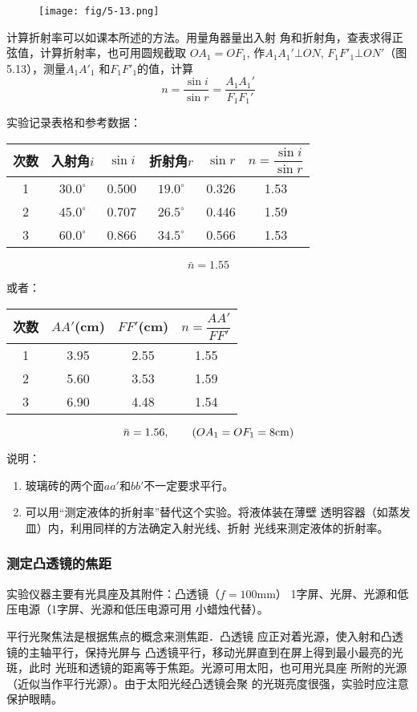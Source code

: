 \begin{figure}[htp]
    \centering
    \texttt{[image: fig/5-13.png]}
    \caption{}
\end{figure}

计算折射率可以如课本所述的方法。用量角器量出入射
角和折射角，查表求得正弦值，计算折射率，也可用圆规截取
$OA_1=OF_1$, 作$A_1A_1'\bot ON$, $F_1F'_1\bot ON'$（图5.13），测量$A_1A'_1$
和$F_1F'_1$的值，计算 
$$n=\frac{\sin i}{\sin r}=\frac{A_1A_1'}{F_1F_1'}$$

实验记录表格和参考数据：
\begin{center}
\begin{tabular}{c|ccccc}
\hline
次数&入射角$i$&$\sin i$&折射角$r$ &$\sin r$&$n=\dfrac{\sin i}{\sin r}$\\
\hline
1&$30.0^{\circ}$&0.500&$19.0^{\circ}$&0.326&1.53\\
2&$45.0^{\circ}$&0.707&$26.5^{\circ}$&0.446&1.59\\
3&$60.0^{\circ}$&0.866&$34.5^{\circ}$&0.566&1.53\\
\hline
\end{tabular}
\[\bar n=1.55\]
\end{center}
或者：
\begin{center}
\begin{tabular}{c|ccc}
\hline
次数&$AA'$(cm)&$FF'$(cm)&$n=\dfrac{AA'}{FF'}$\\
\hline
1&3.95&2.55&1.55\\
2&5.60&3.53&1.59\\
3&6.90&4.48&1.54\\
\hline
\end{tabular}
\[\bar n=1.56,\qquad (OA_1=OF_1=8{\rm cm})\]
\end{center}

说明：
\begin{enumerate}
\item 玻璃砖的两个面$aa'$和$bb'$不一定要求平行。
\item  可以用“测定液体的折射率”替代这个实验。将液体装在薄壁
透明容器（如蒸发皿）内，利用同样的方法确定入射光线、折射
光线来测定液体的折射率。
\end{enumerate}

\subsubsection{测定凸透镜的焦距}
实验仪器主要有光具座及其附件：凸透镜（$f=100$mm）
1字屏、光屏、光源和低压电源（1字屏、光源和低压电源可用
小蜡烛代替）。

平行光聚焦法是根据焦点的概念来测焦距．凸透镜
应正对着光源，使入射和凸透镜的主轴平行，保持光屏与
凸透镜平行，移动光屏直到在屏上得到最小最亮的光斑，此时
光班和透镜的距离等于焦距。光源可用太阳，也可用光具座
所附的光源（近似当作平行光源）。由于太阳光经凸透镜会聚
的光斑亮度很强，实验时应注意保护眼睛。

